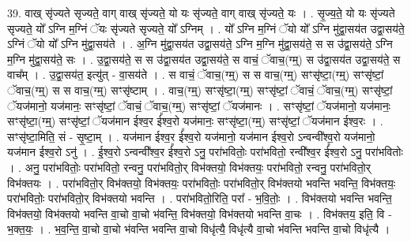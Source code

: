\documentclass[17pt]{extarticle}
\begin{document}
39. वाख् सृ॑ज्यते सृज्यते॒ वाग् वाख् सृ॑ज्यते॒ यो यः सृ॑ज्यते॒ वाग् वाख् सृ॑ज्यते॒ यः । . सृ॒ज्य॒ते॒ यो यः सृ॑ज्यते सृज्यते॒ यो᳚ ऽग्नि म॒ग्निं ॅयः सृ॑ज्यते सृज्यते॒ यो᳚ ऽग्निम् । . यो᳚ ऽग्नि म॒ग्निं ॅयो यो᳚ ऽग्नि मु॑द्वा॒सय॑त उद्वा॒सय॑ते॒ ऽग्निं ॅयो यो᳚ ऽग्नि मु॑द्वा॒सय॑ते । . अ॒ग्नि मु॑द्वा॒सय॑त उद्वा॒सय॑ते॒ ऽग्नि म॒ग्नि मु॑द्वा॒सय॑ते॒ स स उ॑द्वा॒सय॑ते॒ ऽग्नि म॒ग्नि मु॑द्वा॒सय॑ते॒ सः । . उ॒द्वा॒सय॑ते॒ स स उ॑द्वा॒सय॑त उद्वा॒सय॑ते॒ स वाचं॒ ॅवाच॒(ग्म्॒) स उ॑द्वा॒सय॑त उद्वा॒सय॑ते॒ स वाच᳚म् । . उ॒द्वा॒सय॑त॒ इत्यु॑त् - वा॒सय॑ते । . स वाचं॒ ॅवाच॒(ग्म्॒) स स वाच॒(ग्म्॒) सꣳसृ॑ष्टा॒(ग्म्॒) सꣳसृ॑ष्टां॒ ॅवाच॒(ग्म्॒) स स वाच॒(ग्म्॒) सꣳसृ॑ष्टाम् । . वाच॒(ग्म्॒) सꣳसृ॑ष्टा॒(ग्म्॒) सꣳसृ॑ष्टां॒ ॅवाचं॒ ॅवाच॒(ग्म्॒) सꣳसृ॑ष्टां॒ ॅयज॑मानो॒ यज॑मानः॒ सꣳसृ॑ष्टां॒ ॅवाचं॒ ॅवाच॒(ग्म्॒) सꣳसृ॑ष्टां॒ ॅयज॑मानः । . सꣳसृ॑ष्टां॒ ॅयज॑मानो॒ यज॑मानः॒ सꣳसृ॑ष्टा॒(ग्म्॒) सꣳसृ॑ष्टां॒ ॅयज॑मान ईश्व॒र ई᳚श्व॒रो यज॑मानः॒ सꣳसृ॑ष्टा॒(ग्म्॒) सꣳसृ॑ष्टां॒ ॅयज॑मान ईश्व॒रः । . सꣳसृ॑ष्टा॒मिति॒ सं - सृ॒ष्टा॒म् । . यज॑मान ईश्व॒र ई᳚श्व॒रो यज॑मानो॒ यज॑मान ईश्व॒रो ऽन्वन्वी᳚श्व॒रो यज॑मानो॒ यज॑मान ईश्व॒रो ऽनु॑ । . ई॒श्व॒रो ऽन्वन्वी᳚श्व॒र ई᳚श्व॒रो ऽनु॒ परा॑भवितोः॒ परा॑भवितो॒ रन्वी᳚श्व॒र ई᳚श्व॒रो ऽनु॒ परा॑भवितोः । . अनु॒ परा॑भवितोः॒ परा॑भवितो॒ रन्वनु॒ परा॑भवितो॒र् विभ॑क्तयो॒ विभ॑क्तयः॒ परा॑भवितो॒ रन्वनु॒ परा॑भवितो॒र् विभ॑क्तयः । . परा॑भवितो॒र् विभ॑क्तयो॒ विभ॑क्तयः॒ परा॑भवितोः॒ परा॑भवितो॒र् विभ॑क्तयो भवन्ति भवन्ति॒ विभ॑क्तयः॒ परा॑भवितोः॒ परा॑भवितो॒र् विभ॑क्तयो भवन्ति । . परा॑भवितो॒रिति॒ परा᳚ - भ॒वि॒तोः॒ । . विभ॑क्तयो भवन्ति भवन्ति॒ विभ॑क्तयो॒ विभ॑क्तयो भवन्ति वा॒चो वा॒चो भ॑वन्ति॒ विभ॑क्तयो॒ विभ॑क्तयो भवन्ति वा॒चः । . विभ॑क्तय॒ इति॒ वि - भ॒क्त॒यः॒ । . भ॒व॒न्ति॒ वा॒चो वा॒चो भ॑वन्ति भवन्ति वा॒चो विधृ॑त्यै॒ विधृ॑त्यै वा॒चो भ॑वन्ति भवन्ति वा॒चो विधृ॑त्यै । \newline
\end{document}
